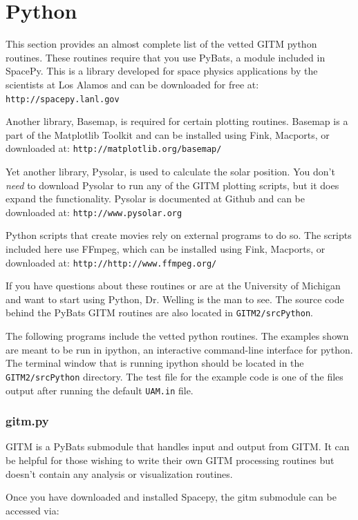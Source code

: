\section{Python}
\label{python.sec}

This section provides an almost complete list of the vetted GITM python routines.  These routines require that you use PyBats, a module included in SpacePy.  This is a library developed for space physics applications by the scientists at Los Alamos and can be downloaded for free at: 
{\tt http://spacepy.lanl.gov}

Another library, Basemap, is required for certain plotting routines.  Basemap is a part of the Matplotlib Toolkit and can be installed using Fink, Macports, or downloaded at:
{\tt http://matplotlib.org/basemap/}

Yet another library, Pysolar, is used to calculate the solar position.  You don't \textit{need} to download Pysolar to run any of the GITM plotting scripts, but it does expand the functionality.  Pysolar is documented at Github and can be downloaded at:
{\tt http://www.pysolar.org}

Python scripts that create movies rely on external programs to do so.  The scripts included here use FFmpeg, which can be installed using Fink, Macports, or downloaded at: {\tt http://http://www.ffmpeg.org/}

If you have questions about these routines or are at the University of Michigan and want to start using Python, Dr. Welling is the man to see.  The source code behind the PyBats GITM routines are also located in {\tt GITM2/srcPython}.

The following programs include the vetted python routines.  The examples shown are meant to be run in ipython, an interactive command-line interface for python.  The terminal window that is running ipython should be located in the {\tt GITM2/srcPython} directory.  The test file for the example code is one of the files output after running the default {\tt UAM.in} file.

\subsubsection{gitm.py}

GITM is a PyBats submodule that handles input and output from GITM.  It can be helpful for those wishing to write their own GITM processing routines but doesn't contain any analysis or visualization routines. 

Once you have downloaded and installed Spacepy, the gitm submodule can be accessed via:

